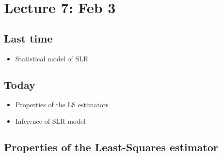 \setcounter{section}{6}


\section{Lecture 7: Feb 3}


\subsection*{Last time}
\begin{itemize}
  \item Statistical model of SLR
\end{itemize}


\subsection*{Today}
\begin{itemize}
  \item Properties of the LS estimators
  \item Inference of SLR model
\end{itemize}



\subsection*{Properties of the Least-Squares estimator}

